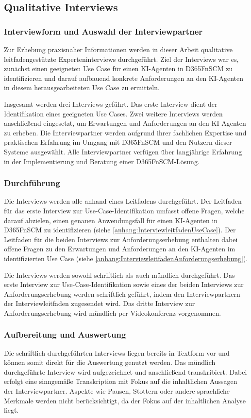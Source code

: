 \subsection{Qualitative Interviews}
\subsubsection{Interviewform und Auswahl der Interviewpartner}
Zur Erhebung praxisnaher Informationen werden in dieser Arbeit qualitative leitfadengestützte Experteninterviews durchgeführt. Ziel der Interviews war es, zunächst einen geeigneten Use Case für einen \ac{KI}-Agenten in \ac{D365FnSCM} zu identifizieren und darauf aufbauend konkrete Anforderungen an den \ac{KI}-Agenten in diesem herausgearbeiteten Use Case zu ermitteln.

Insgesamt werden drei Interviews geführt. Das erste Interview dient der Identifikation eines geeigneten Use Cases. Zwei weitere Interviews werden anschließend eingesetzt, um Erwartungen und Anforderungen an den \ac{KI}-Agenten zu erheben. Die Interviewpartner werden aufgrund ihrer fachlichen Expertise und praktischen Erfahrung im Umgang mit \ac{D365FnSCM} und den Nutzern dieser Systeme ausgewählt. Alle Interviewpartner verfügen über langjährige Erfahrung in der Implementierung und Beratung einer \ac{D365FnSCM}-Lösung.

\subsubsection{Durchführung}
Die Interviews werden alle anhand eines Leitfadens durchgeführt. Der Leitfaden für das erste Interview zur Use-Case-Identifikation umfasst offene Fragen, welche darauf abzielen, einen genauen Anwendungsfall für einen \ac{KI}-Agenten in \ac{D365FnSCM} zu identifizieren (siehe \ref{anhang:InterviewleitfadenUseCase}). Der Leitfaden für die beiden Interviews zur Anforderungserhebung enthalten dabei offene Fragen zu den Erwartungen und Anforderungen an den \ac{KI}-Agenten im identifizierten Use Case (siehe \ref{anhang:InterviewleitfadenAnforderungserhebung}).

Die Interviews werden sowohl schriftlich als auch mündlich durchgeführt. Das erste Interview zur Use-Case-Identifikation sowie eines der beiden Interviews zur Anforderungserhebung werden schriftlich geführt, indem den Interviewpartnern der Interviewleitfaden zugesendet wird. Das dritte Interview zur Anforderungserhebung wird mündlich per Videokonferenz vorgenommen. 

\subsubsection{Aufbereitung und Auswertung}
Die schriftlich durchgeführten Interviews liegen bereits in Textform vor und können somit direkt für die Auswertung genutzt werden. Das mündlich durchgeführte Interview wird aufgezeichnet und anschließend transkribiert. Dabei erfolgt eine sinngemäße Transkription mit Fokus auf die inhaltlichen Aussagen der Interviewpartner. Aspekte wie Pausen, Stottern oder andere sprachliche Merkmale werden nicht berücksichtigt, da der Fokus auf der inhaltlichen Analyse liegt.

